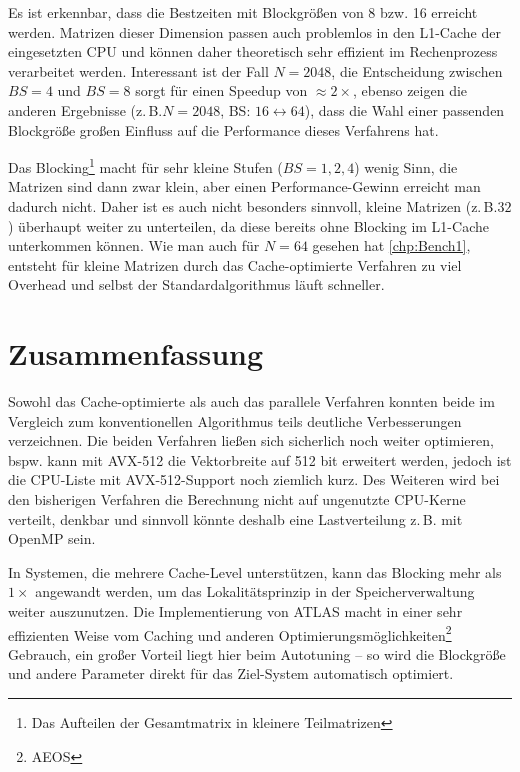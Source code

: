 \documentclass[a4paper,11pt]{scrartcl}
\newcommand{\zB}{\mbox{z.\,B.}\xspace}
\newcommand{\bspw}{\mbox{bspw.}\xspace}
\newcommand{\bzw}{\mbox{bzw.}\xspace}
\begin{document}
Es ist erkennbar, dass die Bestzeiten mit Blockgrößen von 8 \bzw 16 erreicht werden.
Matrizen dieser Dimension passen auch problemlos in den L1-Cache der eingesetzten CPU
und können daher theoretisch sehr effizient im Rechenprozess verarbeitet werden.
Interessant ist der Fall $N=2048$, die Entscheidung zwischen $BS=4$ und $BS=8$
sorgt für einen Speedup von $\approx 2\times$, ebenso zeigen die anderen
Ergebnisse (\zB $N=2048$, BS: $16 \leftrightarrow 64$), dass die Wahl einer
passenden Blockgröße großen Einfluss auf die Performance dieses Verfahrens hat.
\newline

Das Blocking\footnote{Das Aufteilen der Gesamtmatrix in kleinere Teilmatrizen} macht für
sehr kleine Stufen ($BS=1,2,4$)  wenig Sinn, die Matrizen sind dann zwar klein, aber
einen Performance-Gewinn erreicht man dadurch nicht. Daher ist es auch nicht besonders sinnvoll,
kleine Matrizen (\zB $32$) überhaupt weiter zu unterteilen, da diese bereits ohne Blocking
im L1-Cache unterkommen können. Wie man auch für $N=64$ gesehen hat \ref{chp:Bench1}, 
entsteht für kleine 
Matrizen durch das Cache-optimierte Verfahren zu viel Overhead und selbst der
Standardalgorithmus läuft schneller.

\section{Zusammenfassung}
Sowohl das Cache-optimierte als auch das parallele Verfahren konnten beide
im Vergleich zum konventionellen Algorithmus teils deutliche Verbesserungen verzeichnen.
Die beiden Verfahren ließen sich sicherlich noch weiter optimieren, \bspw
kann mit AVX-512 die Vektorbreite auf 512 bit erweitert werden, jedoch ist die
CPU-Liste mit AVX-512-Support noch ziemlich kurz. Des Weiteren wird bei den bisherigen Verfahren
die Berechnung nicht auf ungenutzte CPU-Kerne verteilt, denkbar und sinnvoll könnte
deshalb eine Lastverteilung \zB mit OpenMP sein.\newline
 
In Systemen, die mehrere Cache-Level unterstützen, kann das Blocking mehr als $1\times$ angewandt werden,
um das Lokalitätsprinzip in der Speicherverwaltung weiter auszunutzen.
Die Implementierung von ATLAS macht in einer sehr effizienten Weise vom Caching 
und anderen Optimierungsmöglichkeiten\footnote{AEOS} Gebrauch, ein großer Vorteil
liegt hier beim Autotuning -- so wird die Blockgröße und andere Parameter direkt für das 
Ziel-System automatisch optimiert.\newline
\end{document}

